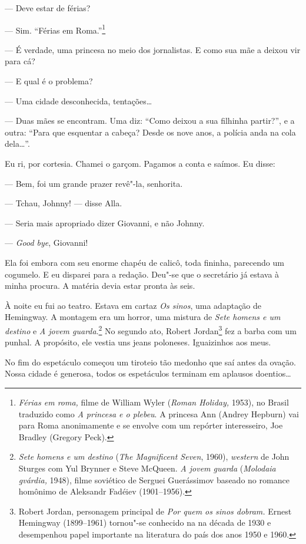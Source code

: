 --- Deve estar de férias?

--- Sim. ``Férias em Roma.''\footnote{\emph{Férias em roma,} filme de
  William Wyler (\emph{Roman Holiday,} 1953), no Brasil traduzido
  como \emph{A princesa e o plebeu}. A princesa Ann (Andrey Hepburn) vai
  para Roma anonimamente e se envolve com um repórter interesseiro, Joe
  Bradley (Gregory Peck).}

--- É verdade, uma princesa no meio dos jornalistas. E como sua mãe a
deixou vir para cá?

--- E qual é o problema?

--- Uma cidade desconhecida, tentações\ldots{}

--- Duas mães se encontram. Uma diz: ``Como deixou a sua filhinha
partir?'', e a outra: ``Para que esquentar a cabeça? Desde os nove anos,
a polícia anda na cola dela\ldots{}''.

Eu ri, por cortesia. Chamei o garçom. Pagamos a conta e saímos. Eu
disse:

--- Bem, foi um grande prazer revê"-la, senhorita.

--- Tchau, Johnny! --- disse Alla.

--- Seria mais apropriado dizer Giovanni, e não Johnny.

--- \emph{Good bye}, Giovanni!

Ela foi embora com seu enorme chapéu de calicô, toda fininha, parecendo
um cogumelo. E eu disparei para a redação. Deu"-se que o secretário já
estava à minha procura. A matéria devia estar pronta às seis.

À noite eu fui ao teatro. Estava em cartaz \emph{Os sinos}, uma
adaptação de Hemingway. A montagem era um horror, uma mistura de
\emph{Sete homens e um destino} e \emph{A jovem guarda}.\footnote{\emph{Sete
  homens e um destino} (\emph{The Magnificent Seven}, 1960),
  \emph{western} de John Sturges com Yul Brynner e Steve McQueen.
  \emph{A jovem guarda} (\emph{Molodaia gvárdia,} 1948), filme soviético
  de Serguei Guerássimov baseado no romance homônimo de Aleksandr
  Fadéiev (1901--1956).} No segundo ato, Robert Jordan\footnote{Robert
  Jordan, personagem principal de \emph{Por quem os sinos dobram.}
  Ernest Hemingway (1899--1961) tornou"-se conhecido na  na década de
  1930 e desempenhou papel importante na literatura do país dos anos
  1950 e 1960.} fez a barba com um punhal. A propósito, ele vestia uns
jeans poloneses. Iguaizinhos aos meus.

No fim do espetáculo começou um tiroteio tão medonho que saí antes da
ovação. Nossa cidade é generosa, todos os espetáculos terminam em
aplausos doentios\ldots{}

